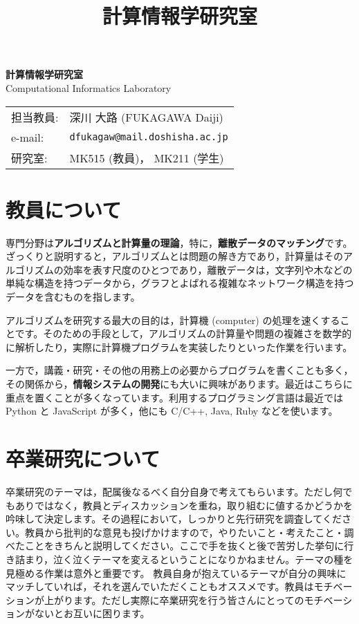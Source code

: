 \documentclass[uplatex,jis2004,a4paper,11pt]{jsarticle}
\title{計算情報学研究室}
\date{}
\renewcommand{\emph}[1]{\textbf{#1}}
\begin{document}
\begin{minipage}[t]{.45\textwidth}
\noindent
{\LARGE\bfseries{} 計算情報学研究室}\\
\hspace{.4cm} Computational Informatics Laboratory
\end{minipage}
\begin{minipage}[t]{.45\textwidth}
\begin{tabular}{l@{ }l}
担当教員: & 深川 大路 (FUKAGAWA Daiji) \\
e-mail: & \texttt{dfukagaw@mail.doshisha.ac.jp} \\
研究室: & MK515 (教員)， MK211 (学生)
\end{tabular}
\end{minipage}


\section{教員について}

専門分野は\emph{アルゴリズムと計算量の理論}，特に，\emph{離散データのマッチング}です。
ざっくりと説明すると，アルゴリズムとは問題の解き方であり，計算量はそのアルゴリズムの効率を表す尺度のひとつであり，離散データは，文字列や木などの単純な構造を持つデータから，グラフとよばれる複雑なネットワーク構造を持つデータを含むものを指します。

アルゴリズムを研究する最大の目的は，計算機 (computer) の処理を速くすることです。そのための手段として，アルゴリズムの計算量や問題の複雑さを数学的に解析したり，実際に計算機プログラムを実装したりといった作業を行います。

一方で，講義・研究・その他の用務上の必要からプログラムを書くことも多く，その関係から，\emph{情報システムの開発}にも大いに興味があります。最近はこちらに重点を置くことが多くなっています。利用するプログラミング言語は最近では Python と JavaScript が多く，他にも C/C++, Java, Ruby などを使います。

\section{卒業研究について}

卒業研究のテーマは，配属後なるべく自分自身で考えてもらいます。ただし何でもありではなく，教員とディスカッションを重ね，取り組むに値するかどうかを吟味して決定します。その過程において，しっかりと先行研究を調査してください。教員から批判的な意見も投げかけますので，やりたいこと・考えたこと・調べたことをきちんと説明してください。ここで手を抜くと後で苦労した挙句に行き詰まり，泣く泣くテーマを変えるということになりかねません。テーマの種を見極める作業は意外と重要です。
教員自身が抱えているテーマが自分の興味にマッチしていれば，それを選んでいただくこともオススメです。教員はモチベーションが上がります。ただし実際に卒業研究を行う皆さんにとってのモチベーションがないとお互いに困ります。
\end{document}
